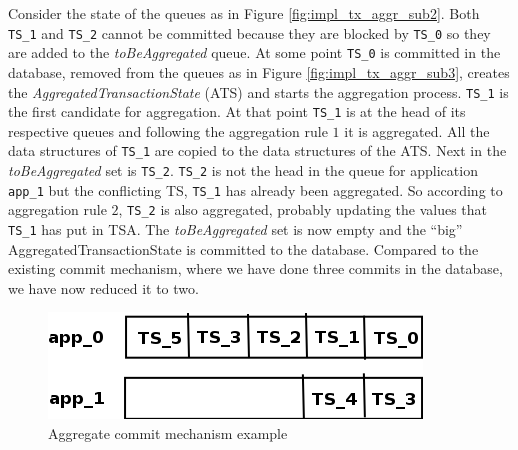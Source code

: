 Consider the state of the queues as in Figure
\ref{fig:impl_tx_aggr_sub2}. Both \texttt{TS\_1} and \texttt{TS\_2}
cannot be committed because they are blocked by \texttt{TS\_0} so they
are added to the \emph{toBeAggregated} queue. At some
point \texttt{TS\_0} is committed in the database, removed from the
queues as in Figure \ref{fig:impl_tx_aggr_sub3}, creates the
\emph{AggregatedTransactionState} (ATS)
and starts the aggregation process. \texttt{TS\_1} is the first
candidate for aggregation. At that point \texttt{TS\_1} is at the head
of its respective queues and following the aggregation rule $1$ it is
aggregated. All the data structures of \texttt{TS\_1} are copied to
the data structures of the ATS. Next in the \emph{toBeAggregated} set
is \texttt{TS\_2}. \texttt{TS\_2} is not the head in the queue for
application \texttt{app\_1} but the conflicting TS, \texttt{TS\_1} has
already been aggregated. So according to aggregation rule $2$,
\texttt{TS\_2} is also aggregated, probably updating the values that
\texttt{TS\_1} has put in TSA. The \emph{toBeAggregated} set is now
empty and the ``big'' AggregatedTransactionState is committed to the
database. Compared to the existing commit mechanism, where we have
done three commits in the database, we have now reduced it to two.

\begin{figure}
\centering
\includegraphics[scale=0.5]{resources/images/Implementation/commit_system_aggr_example.png}
\caption{Aggregate commit mechanism example}
\label{fig:impl_tx_aggr_example}
\end{figure}

